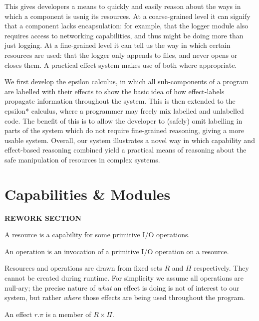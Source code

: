\documentclass[a4paper,UKenglish]{lipics-v2016}
\begin{document}
This gives developers a means to quickly and easily reason about the ways in which a component is usnig its resources. At a coarse-grained level it can signify that a component lacks encapsulation: for example, that the logger module also requires access to networking capabilities, and thus might be doing more than just logging. At a fine-grained level it can tell us the way in which certain resources are used: that the logger only appends to files, and never opens or closes them. A practical effect system makes use of both where appropriate.

We first develop the epsilon calculus, in which all sub-components of a program are labelled with their effects to show the basic idea of how effect-labels propagate information throughout the system. This is then extended to the epsilon* calculus, where a programmer may freely mix labelled and unlabelled code. The benefit of this is to allow the developer to (safely) omit labelling in parts of the system which do not require fine-grained reasoning, giving a more usable system. Overall, our system illustrates a novel way in which capability and effect-based reasoning combined yield a practical means of reasoning about the safe manipulation of resources in complex systems.

\section{Capabilities \& Modules}

\textbf{REWORK SECTION}

\begin{definition}
A resource is a capability for some primitive I/O operations.
\end{definition}

\begin{definition}
An operation is an invocation of a primitive I/O operation on a resource.
\end{definition}

\noindent
Resources and operations are drawn from fixed sets $R$ and $\Pi$ respectively. They cannot be created during runtime. For simplicity we assume all operations are null-ary; the precise nature of \textit{what} an effect is doing is not of interest to our system, but rather \textit{where} those effects are being used throughout the program.

\begin{definition}
An effect $r.\pi$ is a member of $R \times \Pi$.
\end{definition}
\end{document}
